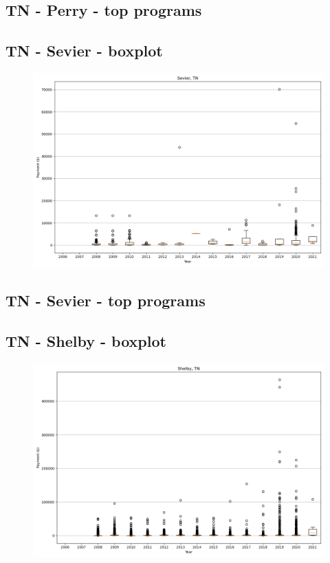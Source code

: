 \subsection*{TN - Perry - top programs}

\newpage
\subsection*{TN - Sevier - boxplot}
\begin{figure}[h]
\centering
\includegraphics[width=7in]{../output/boxplots/counties/Sevier-TN_boxplot.png}
\end{figure}


\subsection*{TN - Sevier - top programs}

\newpage
\subsection*{TN - Shelby - boxplot}
\begin{figure}[h]
\centering
\includegraphics[width=7in]{../output/boxplots/counties/Shelby-TN_boxplot.png}
\end{figure}


